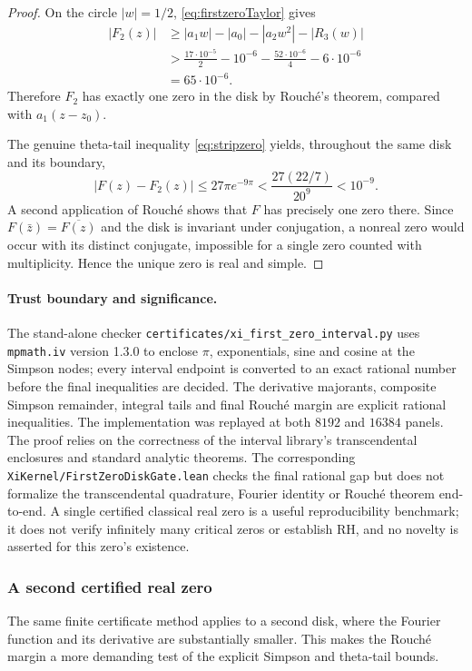 \begin{proof}
On the circle $|w|=1/2$,
\eqref{eq:firstzeroTaylor} gives
\begin{align}
|F_2(z)|
&\ge|a_1w|-|a_0|-|a_2w^2|-|R_3(w)|\nonumber\\
&> \frac{17\cdot10^{-5}}2
-10^{-6}-\frac{52\cdot10^{-6}}4
-6\cdot10^{-6}\nonumber\\
&=65\cdot10^{-6}.
\label{eq:linearmargin}
\end{align}
Therefore $F_2$ has exactly one
zero in the disk by Rouch\'e's
theorem, compared with
$a_1(z-z_0)$.

The genuine theta-tail inequality
\eqref{eq:stripzero} yields, throughout
the same disk and its boundary,
\[
|F(z)-F_2(z)|
\le27\pi e^{-9\pi}
<\frac{27(22/7)}{20^9}
<10^{-9}.
\]
A second application of Rouch\'e
shows that $F$ has precisely one
zero there. Since $F(\bar z)=
\overline{F(z)}$ and the disk is
invariant under conjugation,
a nonreal zero would occur with
its distinct conjugate, impossible
for a single zero counted with
multiplicity. Hence the unique
zero is real and simple.
\end{proof}

\paragraph{Trust boundary and significance.}
The stand-alone checker
\texttt{certificates/xi\_first\_zero\_interval.py}
uses \texttt{mpmath.iv} version 1.3.0
to enclose $\pi$, exponentials, sine
and cosine at the Simpson nodes;
every interval endpoint is converted
to an exact rational number before
the final inequalities are decided.
The derivative majorants,
composite Simpson remainder,
integral tails and final Rouch\'e
margin are explicit rational
inequalities. The implementation
was replayed at both $8192$ and
$16384$ panels. The proof relies
on the correctness of the interval
library's transcendental enclosures
and standard analytic theorems.
The corresponding
\texttt{XiKernel/FirstZeroDiskGate.lean}
checks the final rational gap but
does not formalize the transcendental
quadrature, Fourier identity or
Rouch\'e theorem end-to-end.
A single certified classical
real zero is a useful reproducibility
benchmark; it does not verify
infinitely many critical zeros
or establish RH, and no novelty
is asserted for this zero's existence.

\subsubsection{A second certified real zero}
\label{subsec:secondzerocert}
The same finite certificate method applies to
a second disk, where the Fourier function and
its derivative are substantially smaller.
This makes the Rouch\'e margin a more
demanding test of the explicit Simpson
and theta-tail bounds.


